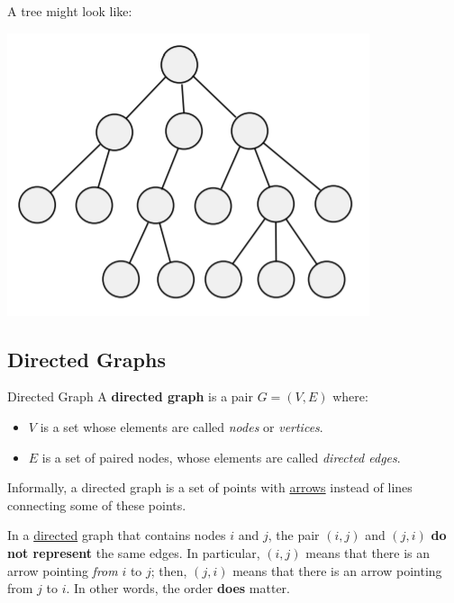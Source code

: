 \documentclass[letterpaper]{article}
\begin{document}
\bigskip

A tree might look like: 
\begin{center}
    \includegraphics[scale=0.42]{../assets/tree.png}
\end{center}


\subsection{Directed Graphs}
\begin{definition}{Directed Graph}{}
    A \textbf{directed graph} is a pair $G = (V, E)$ where: 
    \begin{itemize}
        \item $V$ is a set whose elements are called \emph{nodes} or \emph{vertices}.
        \item $E$ is a set of paired nodes, whose elements are called \emph{directed edges}.
    \end{itemize}
    Informally, a directed graph is a set of points with \underline{arrows} instead of lines connecting some of these points. 
\end{definition}
In a \underline{directed} graph that contains nodes $i$ and $j$, the pair $(i, j)$ and $(j, i)$ \textbf{do not represent} the same edges. In particular, $(i, j)$ means that there is an arrow pointing \emph{from} $i$ to $j$; then, $(j, i)$ means that there is an arrow pointing from $j$ to $i$. In other words, the order \textbf{does} matter. 

\bigskip
\end{document}
